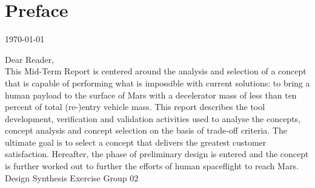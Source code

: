 \section*{Preface}\label{cha:preface}

\begin{flushright}
	\today
\end{flushright}

Dear Reader,	
\\ [1cm]
This Mid-Term Report is centered around the analysis and selection of a concept that is capable of performing what is impossible with current solutions: to bring a human payload to the surface of Mars with a decelerator mass of less than ten percent of total (re-)entry vehicle mass. This report describes the tool development, verification and validation activities used to analyse the concepts, concept analysis and concept selection on the basis of trade-off criteria. The ultimate goal is to select a concept that delivers the greatest customer satisfaction. Hereafter, the phase of preliminary design is entered and the concept is further worked out to further the efforts of human spaceflight to reach Mars.
\\ [1.5cm]
Design Synthesis Exercise Group 02